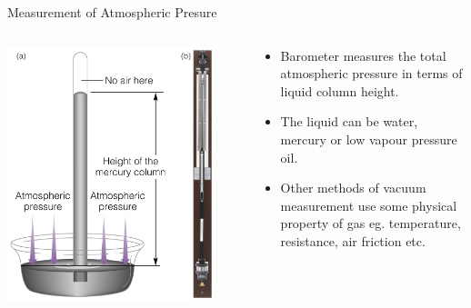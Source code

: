\documentclass[11pt]{beamer}
\begin{document}
\begin{frame}{Measurement of Atmospheric Presure}

    
     
     \begin{columns}[t]
    
      
       \begin{exampleblock}{}
          \begin{center}
			\includegraphics[width=0.9\textwidth]{barometer.jpg}
		\end{center}
       \end{exampleblock}
       
       \begin{exampleblock}{ }
          
            \begin{itemize}
            	\item Barometer measures the total atmospheric pressure in terms of liquid column height. 
                \item  The liquid can be water, mercury or low vapour pressure oil.
                \item  Other methods of vacuum measurement use some physical property of gas eg. temperature, resistance, air friction etc.
            \end{itemize}
            
         
       \end{exampleblock}   
   
    \end{columns}   

\end{frame}
\end{document}

